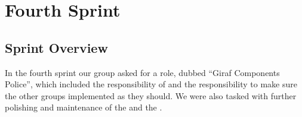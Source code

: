 \part{Fourth Sprint}
\label{par:fourth_sprint}

\chapter{Sprint Overview}
In the fourth sprint our group asked for a role, dubbed ``Giraf Components Police'', which included the responsibility of \gc and the responsibility to make sure the other groups implemented \gc as they should. We were also tasked with further polishing and maintenance of the \ct and the \launcher. 







